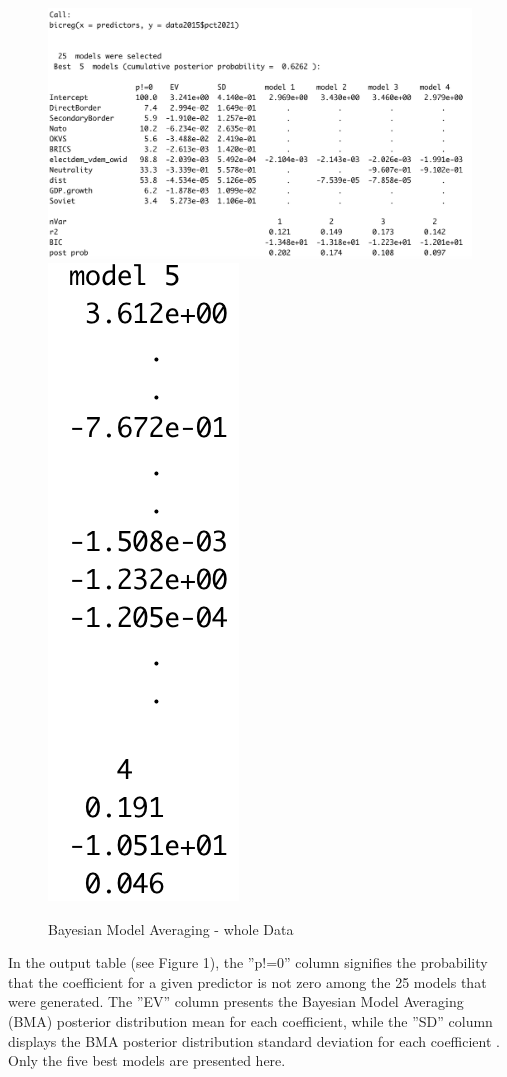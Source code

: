 \documentclass[12pt,a4paper]{article}
\begin{document}
\begin{figure}[h]
\center
\label{F:2}
\includegraphics[scale=0.5]{BMA_results}
\includegraphics[scale=0.5]{BMA_results_2}
\caption{Bayesian Model Averaging - whole Data}
\end{figure}

In the output table (see Figure 1), the ''p!=0'' column signifies the probability that the coefficient for a given predictor is not zero among the 25 models that were generated. The ''EV'' column presents the Bayesian Model Averaging (BMA) posterior distribution mean for each coefficient, while the ''SD'' column displays the BMA posterior distribution standard deviation for each coefficient \citep{starkweather2011}. Only the five best models are presented here. 
\end{document}
